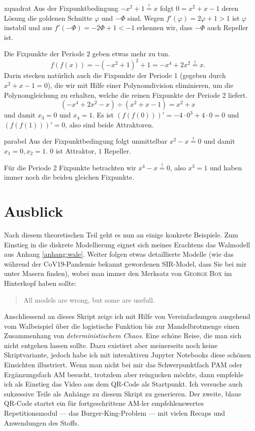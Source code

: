 \documentclass[%
<<<<<<< Updated upstream
<<<<<<< Updated upstream
11pt,%
twoside,%
titlepage,%
german,%
headsepline%
]{scrartcl}
\begin{document}
\begin{lsg}{xquadrat}
    Aus der Fixpunktbedingung $-x^2+1\stackrel{!}{=}x$ folgt $0=x^2+x-1$ deren Lösung die goldenen Schnitte $\varphi$ und $-\Phi$ sind. Wegen $f'(\varphi)=2\varphi+1>1$ ist $\varphi$ instabil und aus $f'(-\Phi)=-2\Phi+1<-1$ erkennen wir, dass $-\Phi$ auch Repeller ist.

    Die Fixpunkte der Periode $2$ geben etwas mehr zu tun.
    $$f(f(x))=-(-x^2+1)^2+1=-x^4+2x^2\stackrel{!}{=}x.$$
    Darin stecken natürlich auch die Fixpunkte der Periode $1$ (gegeben durch $x^2+x-1=0$), die wir mit Hilfe einer Polynomdivision eliminieren, um die Polynomgleichung zu erhalten, welche die reinen Fixpunkte der Periode 2 liefert.
    $$(-x^4+2x^2-x)\div(x^2+x-1)=x^2+x$$
    und damit $x_3=0$ und $x_4=1$. Es ist $(f(f(0)))'=-4\cdot0^3+4\cdot0=0$ und $(f(f(1)))'=0$, also sind beide Attraktoren.
\end{lsg}
\begin{lsg}{parabel}
    Aus der Fixpunktbedingung folgt unmittelbar $x^2-x\stackrel{!}{=}0$ und damit $x_1=0, x_2=1$. $0$ ist Attraktor, $1$ Repeller.

    Für die Periode 2 Fixpunkte betrachten wir $x^4-x\stackrel{!}{=}0$, also $x^3=1$ und haben immer noch die beiden gleichen Fixpunkte.
\end{lsg}

\clearpage

\section{Ausblick}

Nach
diesem theoretischen Teil geht es nun an einige konkrete Beispiele. Zum Einstieg in die diskrete Modellierung eignet sich meines Erachtens das Walmodell aus Anhang \ref{anhang:wale}. Weiter folgen etwas detaillierte Modelle (wie das während der CoV19-Pandemie bekannt gewordenen SIR-Model, dass Sie bei mir unter Masern finden), wobei man immer den Merksatz von \textsc{George Box} im Hinterkopf haben sollte:

\begin{quote}
    All models are wrong, but some are usefull.
\end{quote}

Anschliessend
an dieses Skript zeige ich mit Hilfe von Vereinfachungen ausgehend vom Walbeispiel über die logistische Funktion bis zur Mandelbrotmenge einen Zusammenhang von \emph{deterministischem Chaos}. Eine schöne Reise, die man sich nicht entgehen lassen sollte. Dazu existiert aber meinerseits noch keine Skriptvariante, jedoch habe ich mit interaktiven Jupyter Notebooks diese schönen Einsichten illustriert. Wenn man nicht bei mir das Schwerpunktfach PAM oder Ergänzungsfach AM besucht, trotzdem aber reingucken möchte, dann empfehle ich als Einstieg das Video aus dem QR-Code als Startpunkt. Ich versuche auch sukzessive Teile als Anhänge zu diesem Skript zu generieren. Der
zweite, blaue QR-Code startet ein für fortgeschrittene AM-ler empfehlenswertes Repetitionsmodul --- das Burger-King-Problem --- mit vielen Recaps und Anwendungen des Stoffs.
\end{document}
